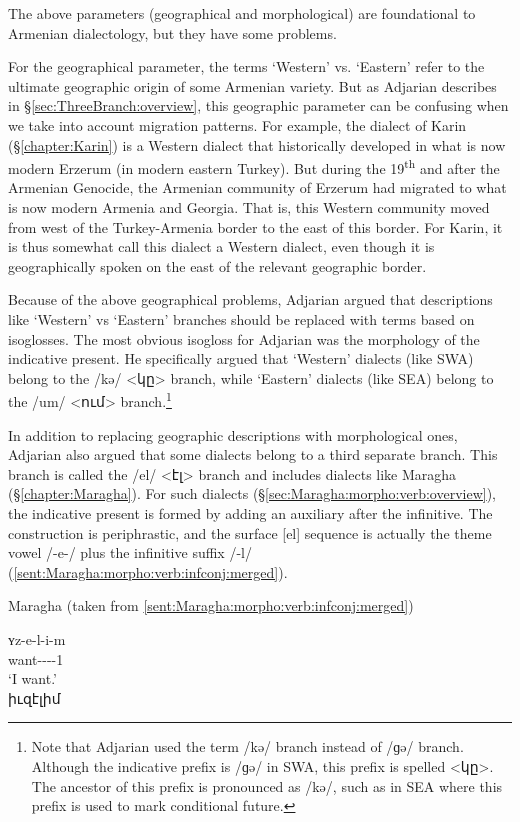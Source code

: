 The above  parameters (geographical and morphological) are foundational to Armenian dialectology, but they have some problems. 

For the geographical parameter, the terms `Western' vs. `Eastern' refer to the ultimate geographic origin of some Armenian variety. But as Adjarian describes in \S\ref{sec:ThreeBranch:overview}, this geographic parameter can be confusing when we take into account migration patterns. For example, the dialect of Karin  (\S\ref{chapter:Karin}) is a Western dialect that historically developed in what is now modern Erzerum (in modern eastern Turkey). But during the 19\textsuperscript{th} and after the Armenian Genocide,   the Armenian community of Erzerum had migrated to what is now modern Armenia and Georgia. That is, this Western community moved from west of the Turkey-Armenia border to the east of this border. For Karin, it is thus somewhat call this dialect a Western dialect, even though it is geographically spoken on the east of the relevant geographic border. 

Because of the above geographical problems, Adjarian argued that descriptions like `Western' vs `Eastern' branches should be replaced with terms based on isoglosses. The most obvious isogloss for Adjarian was the morphology of the indicative present. He specifically argued that `Western' dialects (like SWA) belong to the /kə/ <կը> branch, while `Eastern' dialects (like SEA) belong to the /um/ <ում> branch.\footnote{Note that Adjarian used the term /kə/ branch instead of /ɡə/ branch. Although the   indicative prefix is /ɡə/ in SWA, this prefix is spelled <կը>. The ancestor of this prefix is pronounced as /kə/, such as in SEA where this prefix is used to mark conditional future.}

In addition to replacing geographic descriptions with morphological ones, Adjarian also argued that some dialects belong to a third separate branch. This branch is called the /el/ <էլ> branch and includes dialects like Maragha (\S\ref{chapter:Maragha}). For such dialects (\S\ref{sec:Maragha:morpho:verb:overview}), the indicative present   is formed by adding an auxiliary after the infinitive. The construction is periphrastic, and the surface [el] sequence is actually the theme vowel /-e-/ plus the infinitive suffix /-l/ (\ref{sent:Maragha:morpho:verb:infconj:merged}). 

\begin{exe}
		\ex Maragha (taken from \ref{sent:Maragha:morpho:verb:infconj:merged})
	
	 \gll ʏz-e-l-i-m \\
			want-{\thgloss}-{\infgloss}-{\aux}-1{\sg} \\
			\trans `I want.'\\
			իւզէլիմ \label{sent:Maragha:morpho:verb:infconj:merged REP in intro} 
			
	
\end{exe}

